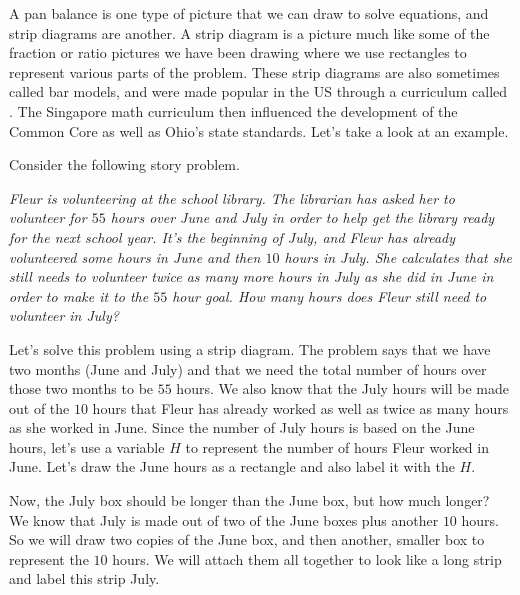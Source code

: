 \documentclass{ximera}
\begin{document}
A pan balance is one type of picture that we can draw to solve equations, and strip diagrams are another. A strip diagram is a picture much like some of the fraction or ratio pictures we have been drawing where we use rectangles to represent various parts of the problem. These strip diagrams are also sometimes called bar models, and were made popular in the US through a curriculum called . The Singapore math curriculum then influenced the development of the Common Core as well as Ohio's state standards. Let's take a look at an example.

\begin{example}
Consider the following story problem.

\emph{Fleur is volunteering at the school library. The librarian has asked her to volunteer for $55$ hours over June and July in order to help get the library ready for the next school year. It's the beginning of July, and Fleur has already volunteered some hours in June and then $10$ hours in July. She calculates that she still needs to volunteer twice as many more hours in July as she did in June in order to make it to the $55$ hour goal. How many hours does Fleur still need to volunteer in July?}

Let's solve this problem using a strip diagram. The problem says that we have two months (June and July) and that we need the total number of hours over those two months to be $55$ hours. We also know that the July hours will be made out of the $10$ hours that Fleur has already worked as well as twice as many hours as she worked in June. Since the number of July hours is based on the June hours, let's use a variable $H$ to represent the number of hours Fleur worked in June. Let's draw the June hours as a rectangle and also label it with the $H$.
\begin{image}\end{image}

Now, the July box should be longer than the June box, but how much longer? We know that July is made out of two of the June boxes plus another $10$ hours. So we will draw two copies of the June box, and then another, smaller box to represent the $10$ hours. We will attach them all together to look like a long strip and label this strip July.


\end{example}
\end{document}
